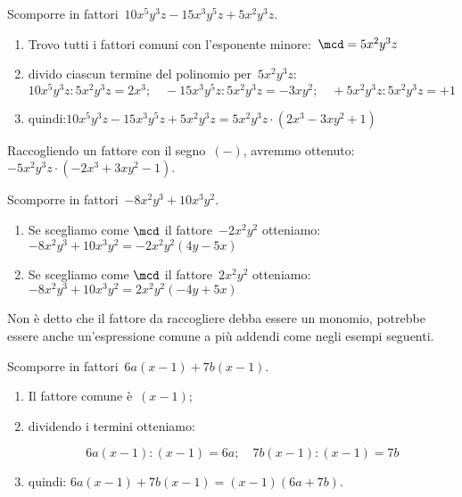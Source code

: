 \begin{esempio}{}{}
Scomporre in fattori~\(10x^{5}y^{3}z-15x^3y^{5}z+5x^2y^{3}z\).
\begin{enumerate} [left=0mm, noitemsep]
\item Trovo tutti i fattori comuni con l'esponente 
minore:~\(\mcd=5x^2y^{3}z\)
\item divido ciascun termine del polinomio per~\(5x^2y^{3}z\):\\[.2em]
\hspace*{-8mm} {\small 
\(10x^{5}y^{3}z:5x^2y^{3}z=2x^3; \quad
-15x^3y^{5}z:5x^2y^{3}z=-3xy^{2}; \quad
+5x^2y^{3}z:5x^2y^{3}z=+1\)
}\\[-.7em]
\item quindi:\quad \(10x^{5}y^{3}z-15x^3y^{5}z+5x^2y^{3}z =
5x^2y^{3}z \cdot (2x^3-3xy^{2}+1)\)
\end{enumerate}
\end{esempio}


\begin{osservazione}{}{} 
Raccogliendo un fattore con il segno~\((-)\), avremmo 
ottenuto:~\(-5x^2y^{3}z \cdot (-2x^3+3xy^{2}-1)\).
\end{osservazione}

\begin{esempio}{}{}
Scomporre in fattori~\(-8x^2y^{3}+10x^3y^{2}\).
\begin{enumerate} [left=0mm, noitemsep]
\item  Se scegliamo come \(\mcd\) il fattore~\(-2x^2y^{2}\)
otteniamo: \\
\(-8x^2y^{3}+10x^3y^{2}=-2x^2y^{2}(4y-5x)\)
\item Se scegliamo come \(\mcd\) il fattore~\(2x^2y^{2}\)
otteniamo: \\
\(-8x^2y^{3}+10x^3y^{2}=2x^2y^{2}(-4y+5x)\)
\end{enumerate}
\end{esempio}

Non è detto che il fattore da raccogliere debba essere un monomio, 
potrebbe essere anche un'espressione comune a più addendi come 
negli esempi seguenti.

\begin{esempio}{}{}
Scomporre in fattori~\(6a(x-1)+7b(x-1)\).
\begin{enumerate} [left=0mm, noitemsep]
\item Il fattore comune è~\((x-1)\); 
\item dividendo i termini otteniamo:

\vspace{-1.2em}
\[6a(x-1):(x-1)=6a; \quad 7b(x-1):(x-1)=7b\]
\vspace{-1.6em}
\item quindi: \quad \(6a(x-1)+7b(x-1)=(x-1)(6a+7b)\).
\end{enumerate}
\end{esempio}

